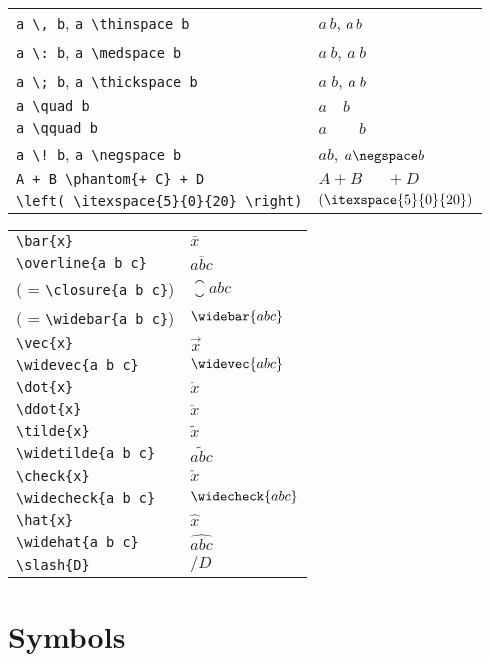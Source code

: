\documentclass[text,xhtml,itex]{internet}
\begin{document}
\begin{tabular}{ll}
\verb+a \, b+, \verb+a \thinspace b+         & \(a \, b\), \(a \thinspace b\) \\
\verb+a \: b+, \verb+a \medspace b+          & \(a \: b\), \(a \medspace b\) \\
\verb+a \; b+, \verb+a \thickspace b+        & \(a \; b\), \(a \thickspace b\) \\
\verb+a \quad b+                        & \(a \quad b\) \\
\verb+a \qquad b+                       & \(a \qquad b\) \\
\verb+a \! b+, \verb+a \negspace b+          & \(a \! b\), \(a \negspace b\) \\
\verb-A + B \phantom{+ C} + D-          & \(A + B \phantom{+ C} + D\) \\
\verb+\left( \itexspace{5}{0}{20} \right)+  & \(\left( \itexspace{5}{0}{20} \right)\)
\end{tabular}

\begin{tabular}{ll}
\verb+\bar{x}+               & \(\bar{x}\) \\
\verb+\overline{a b c}+      & \(\overline{a b c}\) \\
( = \verb+\closure{a b c}+)  & \(\closure{a b c}\) \\
( = \verb+\widebar{a b c}+)  & \(\widebar{a b c}\) \\
\verb+\vec{x}+               & \(\vec{x}\) \\
\verb+\widevec{a b c}+       & \(\widevec{a b c}\) \\
\verb+\dot{x}+               & \(\dot{x}\) \\
\verb+\ddot{x}+              & \(\ddot{x}\) \\
\verb+\tilde{x}+             & \(\tilde{x}\) \\
\verb+\widetilde{a b c}+     & \(\widetilde{a b c}\) \\
\verb+\check{x}+             & \(\check{x}\) \\
\verb+\widecheck{a b c}+     & \(\widecheck{a b c}\) \\
\verb+\hat{x}+               & \(\hat{x}\) \\
\verb+\widehat{a b c}+       & \(\widehat{a b c}\) \\
\verb+\slash{D}+             & \(\slash{D}\)
\end{tabular}

\section{Symbols}
\end{document}
